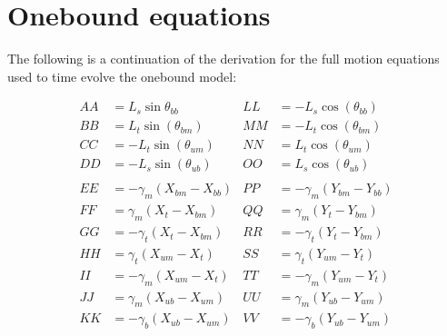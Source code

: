\documentclass[
11pt, %
english, %
singlespacing, %
headsepline, %
chapterinoneline, %
]{MastersDoctoralThesis} %
\begin{document}

\chapter{Onebound equations} %
\label{sec:AppendixOneboundEquations}

The following is a continuation of the derivation for the full motion equations used to time evolve the onebound model:

\begin{align*}
AA &= L_s\sin\theta_{bb}      &   LL &= -L_s\cos(\theta_{bb})\\
BB &= L_t\sin(\theta_{bm})    &	 MM &= -L_t\cos(\theta_{bm})\\
CC &= -L_t\sin(\theta_{um})   &	 NN &= L_t\cos(\theta_{um})\\
DD &= -L_s\sin(\theta_{ub})   &	 OO &= L_s\cos(\theta_{ub})\\
\\
EE &= -\gamma_m (X_{bm} - X_{bb})       &  PP &= -\gamma_m (Y_{bm} - Y_{bb})\\
FF &= \gamma_m (X_{t } - X_{bm})        &	 QQ &= \gamma_m (Y_{t } - Y_{bm})\\ 
GG &= -\gamma_t (X_{t } - X_{bm})       &	 RR &= -\gamma_t (Y_{t } - Y_{bm})\\
HH &= \gamma_t (X_{um} - X_{t })        &	 SS &= \gamma_t (Y_{um} - Y_{t })\\ 
II &= -\gamma_m (X_{um} - X_{t })       &	 TT &= -\gamma_m (Y_{um} - Y_{t })\\
JJ &= \gamma_m (X_{ub} - X_{um})        &	 UU &= \gamma_m (Y_{ub} - Y_{um})\\ 
KK &= -\gamma_b (X_{ub} - X_{um})       &	 VV &= -\gamma_b (Y_{ub} - Y_{um})\\
\end{align*}%
%
\end{document}
